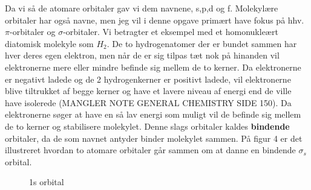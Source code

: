 \documentclass[12pt,a4paper]{article}
\theoremstyle{break}
\theoremstyle{nonumberplain}
\begin{document}
Da vi så de atomare orbitaler gav vi dem navnene, s,p,d og f. Molekylære orbitaler har også navne, men jeg vil i denne opgave primært have fokus på hhv. $\pi$-orbitaler og $\sigma$-orbitaler. Vi betragter et eksempel med et homonukleært diatomisk molekyle som $H_2$. De to hydrogenatomer der er bundet sammen har hver deres egen elektron, men når de er sig tilpas tæt nok på hinanden vil elektronerne mere eller mindre befinde sig mellem de to kerner. Da elektronerne er negativt ladede og de 2 hydrogenkerner er positivt ladede, vil elektronerne blive tiltrukket af begge kerner og have et lavere niveau af energi end de ville have isolerede (MANGLER NOTE GENERAL CHEMISTRY SIDE 150). Da elektronerne søger at have en så lav energi som muligt vil de befinde sig mellem de to kerner og stabilisere molekylet. Denne slags orbitaler kaldes \textbf{bindende} orbitaler, da de som navnet antyder binder molekylet sammen. På figur 4 er det illustreret hvordan to atomare orbitaler går sammen om at danne en bindende $\sigma_s$ orbital. 
\begin{center}
\begin{figure}[ht!]
  \centering
  \caption{1s orbital} \end{figure}
	\end{center}
	
\end{document}
